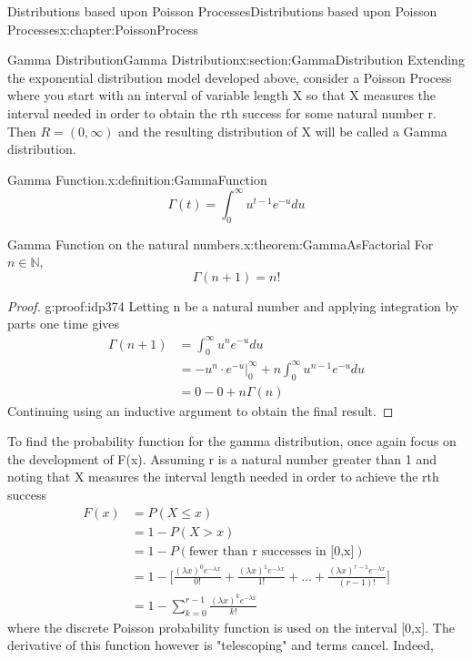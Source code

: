 \documentclass[oneside,10pt,]{book}
\numberwithin{equation}{section}
\newcommand{\gt}{>}
\begin{document}
\begin{chapterptx}{Distributions based upon Poisson Processes}{}{Distributions based upon Poisson Processes}{}{}{x:chapter:PoissonProcess}
\begin{sectionptx}{Gamma Distribution}{}{Gamma Distribution}{}{}{x:section:GammaDistribution}
Extending the exponential distribution model developed above, consider a Poisson Process where you start with an interval of variable length X so that X measures the interval needed in order to obtain the rth success for some natural number r. Then \(R = (0,\infty)\) and the resulting distribution of X will be called a Gamma distribution.%
\begin{definition}{Gamma Function.}{x:definition:GammaFunction}%
%
\begin{equation*}
\Gamma(t) = \int_0^{\infty} u^{t-1} e^{-u} du
\end{equation*}
%
\end{definition}
\begin{theorem}{Gamma Function on the natural numbers.}{}{x:theorem:GammaAsFactorial}%
For \(n \in \mathbb{N}\),%
\begin{equation*}
\Gamma(n+1) = n!
\end{equation*}
%
\end{theorem}
\begin{proof}{}{g:proof:idp374}
Letting n be a natural number and applying integration by parts one time gives%
\begin{align*}
\Gamma(n+1) & = \int_0^{\infty} u^n e^{-u} du\\
& = -u^n \cdot e^{-u} \big |_0^{\infty} + n \int_0^{\infty} u^{n-1} e^{-u} du \\
& = 0 - 0 + n \Gamma(n)
\end{align*}
Continuing using an inductive argument to obtain the final result.%
\end{proof}
To find the probability function for the gamma distribution, once again focus on the development of F(x). Assuming r is a natural number greater than 1 and noting that X measures the interval length needed in order to achieve the rth success%
\begin{align*}
F(x) & = P(X \le x)\\
& = 1 - P(X \gt x)\\
& = 1 - P(\text{fewer than r successes in [0,x]})\\
& = 1 - \big [ \frac{(\lambda x)^0 e^{-\lambda x}}{0!} + \frac{(\lambda x)^1 e^{-\lambda x}}{1!} + ... + \frac{(\lambda x)^{r-1} e^{-\lambda x}}{(r-1)!} \big ]\\
& = 1 - \sum_{k=0}^{r-1} \frac{(\lambda x)^k e^{-\lambda x}}{k!} 
\end{align*}
where the discrete Poisson probability function is used on the interval [0,x]. The derivative of this function however is "telescoping" and terms cancel. Indeed,%

\end{sectionptx}
\end{chapterptx}
\end{document}
